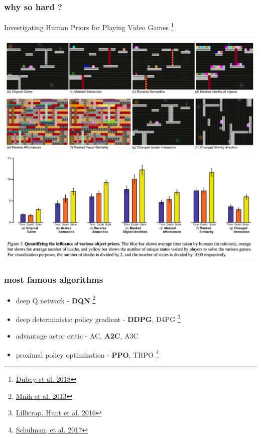 \documentclass{beamer}
\begin{document}
\begin{frame}
  
  \frametitle{why so hard ?} 

  {Investigating Human Priors for Playing Video Games \footnote{\href{https://arxiv.org/pdf/1802.10217.pdf}{Dubey et al. 2018}} }

  \centering
  \includegraphics[scale=0.25]{../papers_captions/human_priors_0.png}
  \includegraphics[scale=0.25]{../papers_captions/human_priors_1.png}
  
\end{frame}


\begin{frame}
  
  \frametitle{most famous algorithms} 

  \begin{itemize}
    \item deep Q network - {\bf DQN} \footnote{\href{https://arxiv.org/pdf/1312.5602.pdf}{Mnih et al. 2013}}
    \item deep deterministic policy gradient - {\bf DDPG}, D4PG \footnote{\href{https://arxiv.org/pdf/1509.02971.pdf}{Lillicrap, Hunt et al. 2016}}
    \item advantage actor critic - AC, {\bf A2C}, A3C
    \item proximal policy optimization - {\bf PPO}, TRPO \footnote{\href{https://arxiv.org/pdf/1707.06347.pdf}{Schulman, et al. 2017}}
  \end{itemize}

\end{frame}
\end{document}
